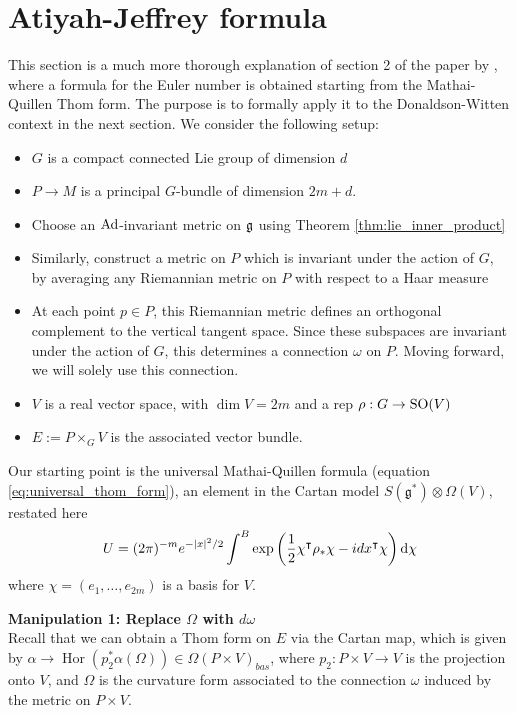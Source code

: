 \section{Atiyah-Jeffrey formula}
This section is a much more thorough explanation of section 2 of the paper by
\citet{atiyahlagrangians}, where a formula for the Euler number is obtained
starting from the Mathai-Quillen Thom form. 
The purpose is to formally apply it to the Donaldson-Witten context in the next
section. We consider the following setup: 
\begin{itemize}
	\item $G$ is a compact connected Lie group of dimension $d$
	\item $P\to M$ is a principal $G$-bundle  of dimension  $2m+d$.
	\item Choose an $\operatorname{Ad}$-invariant metric on $\operatorname{\mathfrak{g}}$ using Theorem 
		\ref{thm:lie_inner_product}
	\item Similarly, construct a metric on $P$ which is invariant under the 
		action of  $G$, by averaging any Riemannian metric on $P$ with respect 
		to a Haar measure  
	\item At each point $p\in P$, this Riemannian metric defines an orthogonal
complement to the vertical tangent space. Since these subspaces are invariant
under the action of $G$, this determines a connection  $\omega$ on  $P$.
Moving forward, we will solely use this connection.
	\item $V$ is a real vector space, with $\dim V = 2m$ and a
rep $\rho : G \to \operatorname{SO}(V)$
	\item $E:= P\times_G V$ is the associated vector bundle.
\end{itemize}

Our starting point is the universal Mathai-Quillen formula
(equation \ref{eq:universal_thom_form}), an element in the
Cartan model $S(\mathfrak{g}^*)\otimes \Omega(V)$, restated here
\begin{equation} \label{eq:universal_thom_form2}
	U = (2\pi)^{-m}e^{-\abs{x}^2 /2}\int^B
	\exp\paren{\frac{1}{2}\chi^{\intercal}\rho_*\chi - idx^\intercal \chi}
	\odif{\chi}
\end{equation}
where $\chi = (e_1,\ldots,e_{2m})$ is a basis for $V$.

\vspace{1ex}\noindent
\textbf{Manipulation 1: Replace $\Omega$ with  $d\omega$} \\
Recall that we can obtain a Thom form on $E$ via the Cartan map, which is given
by $\alpha\to \operatorname{Hor}(p_2^*\alpha(\Omega)) \in \Omega(P\times V)_{bas}$, 
where $p_2:P\times V\to V$ is the projection onto $V$, and $\Omega$ is the
curvature form associated to the connection $\omega$ induced by the
metric on $P\times V$.

